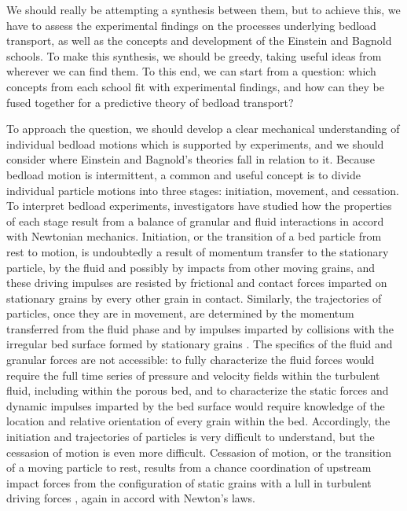 \documentclass{article}
\begin{document}
We should really be attempting a synthesis between them, but to achieve this, we have to assess the experimental findings on the processes underlying bedload transport, as well as the concepts and development of the Einstein and Bagnold schools.  
To make this synthesis, we should be greedy, taking useful ideas from wherever we can find them. 
To this end, we can start from a question: which concepts from each school fit with experimental findings, and how can they be fused together for a predictive theory of bedload transport?  


To approach the question, we should develop a clear mechanical understanding of individual bedload motions which is supported by experiments, and we should consider where Einstein and Bagnold's theories fall in relation to it.  
Because bedload motion is intermittent, a common and useful concept is to divide individual particle motions into three stages: initiation, movement, and cessation. 
To interpret bedload experiments, investigators have studied how the properties of each stage result from a balance of granular and fluid interactions in accord with Newtonian mechanics. 
Initiation, or the transition of a bed particle from rest to motion, is undoubtedly a result of momentum transfer to the stationary particle, by the fluid and possibly by impacts from other moving grains, and these driving impulses are resisted by frictional and contact forces imparted on stationary grains by every other grain in contact. 
Similarly, the trajectories of particles, once they are in movement, are determined by the momentum transferred from the fluid phase and by impulses imparted by collisions with the irregular bed surface formed by stationary grains \citep{Wiberg1985, Bialik2015}. 
The specifics of the fluid and granular forces are not accessible: to fully characterize the fluid forces would require the full time series of pressure and velocity fields within the turbulent fluid, including within the porous bed, and to characterize the static forces and dynamic impulses imparted by the bed surface would require knowledge of the location and relative orientation of every grain within the bed. 
Accordingly, the initiation and trajectories of particles is very difficult to understand, but the cessasion of motion is even more difficult. 
Cessasion of motion, or the transition of a moving particle to rest, results from a chance coordination of upstream impact forces from the configuration of static grains with a lull in turbulent driving forces \citep{Pahtz2018}, again in accord with Newton's laws.  
\end{document}
